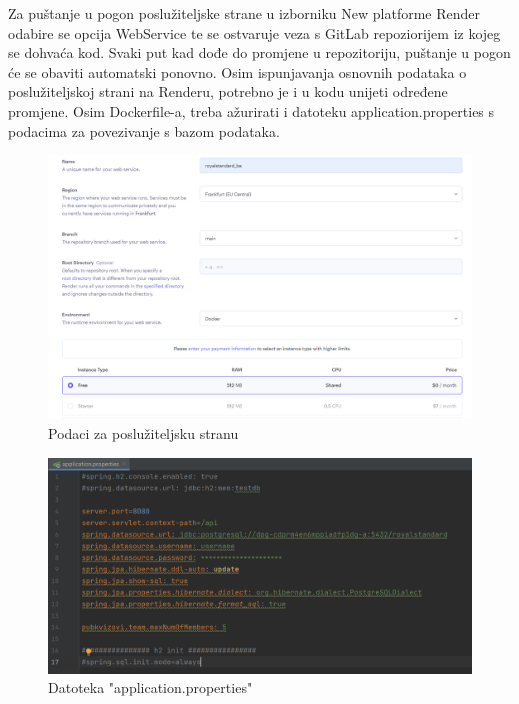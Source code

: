 		
		Za puštanje u pogon poslužiteljske strane u izborniku New platforme Render odabire se opcija WebService te se ostvaruje veza s GitLab repoziorijem iz kojeg se dohvaća kod. Svaki put kad dođe do promjene u repozitoriju, puštanje u pogon će se obaviti automatski ponovno. Osim ispunjavanja osnovnih podataka o poslužiteljskoj strani na Renderu, potrebno je i u kodu unijeti određene promjene. Osim Dockerfile-a, treba ažurirati i datoteku application.properties s podacima za povezivanje s bazom podataka. 
		
		\begin{figure}[H]
			\includegraphics[width=\textwidth]{slike/osnovnipodacibackend.PNG} 
			\caption{Podaci za poslužiteljsku stranu}
			\label{fig:Podaci za poslužiteljsku stranu}
		\end{figure}
	
		\begin{figure}[H]
			\includegraphics[width=\textwidth]{slike/applicationproperties.PNG} 
			\caption{Datoteka "application.properties"}
			\label{fig:application.properties}
		\end{figure}
		
